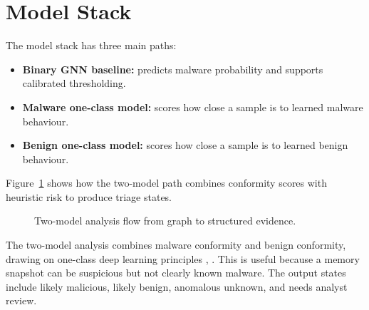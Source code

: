 \section{Model Stack}

The model stack has three main paths:

\begin{itemize}
\item \textbf{Binary GNN baseline:} predicts malware probability and supports calibrated thresholding.
\item \textbf{Malware one-class model:} scores how close a sample is to learned malware behaviour.
\item \textbf{Benign one-class model:} scores how close a sample is to learned benign behaviour.
\end{itemize}

Figure~\ref{fig:two_model} shows how the two-model path combines conformity scores with heuristic risk to produce triage states.

\begin{figure}[htbp]
\centering
{}
\caption{Two-model analysis flow from graph to structured evidence.}
\label{fig:two_model}
\end{figure}

The two-model analysis combines malware conformity and benign conformity, drawing on one-class deep learning principles \cite{ruff2018deep}, \cite{pang2021deep}. This is useful because a memory snapshot can be suspicious but not clearly known malware. The output states include likely malicious, likely benign, anomalous unknown, and needs analyst review.

